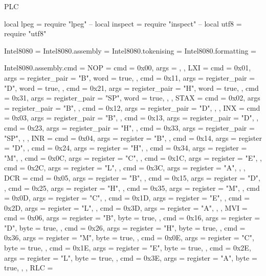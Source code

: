 \startenvironment PLC

\startluacode

local lpeg = require "lpeg"
-- local inspect = require "inspect"
-- local utf8 = require "utf8"

Intel8080 = {}
Intel8080.assembly = {}
Intel8080.tokenising = {}
Intel8080.formatting = {}

Intel8080.assembly.cmd = {
    NOP  = {
        {cmd = 0x00, args = {}},
    },
    LXI  = {
        { cmd = 0x01, args = {{register_pair = "B"},  {word = true}}, },
        { cmd = 0x11, args = {{register_pair = "D"},  {word = true}}, },
        { cmd = 0x21, args = {{register_pair = "H"},  {word = true}}, },
        { cmd = 0x31, args = {{register_pair = "SP"}, {word = true}}, },
    },
    STAX = {
        { cmd = 0x02, args = {{register_pair = "B"}}, },
        { cmd = 0x12, args = {{register_pair = "D"}}, },
    },
    INX  = {
        { cmd = 0x03, args = {{register_pair = "B"}}, },
        { cmd = 0x13, args = {{register_pair = "D"}}, },
        { cmd = 0x23, args = {{register_pair = "H"}}, },
        { cmd = 0x33, args = {{register_pair = "SP"}}, },
    },
    INR  = {
        { cmd = 0x04, args = {{register = "B"}}, },
        { cmd = 0x14, args = {{register = "D"}}, },
        { cmd = 0x24, args = {{register = "H"}}, },
        { cmd = 0x34, args = {{register = "M"}}, },
        { cmd = 0x0C, args = {{register = "C"}}, },
        { cmd = 0x1C, args = {{register = "E"}}, },
        { cmd = 0x2C, args = {{register = "L"}}, },
        { cmd = 0x3C, args = {{register = "A"}}, },
    },
    DCR  = {
        { cmd = 0x05, args = {{register = "B"}}, },
        { cmd = 0x15, args = {{register = "D"}}, },
        { cmd = 0x25, args = {{register = "H"}}, },
        { cmd = 0x35, args = {{register = "M"}}, },
        { cmd = 0x0D, args = {{register = "C"}}, },
        { cmd = 0x1D, args = {{register = "E"}}, },
        { cmd = 0x2D, args = {{register = "L"}}, },
        { cmd = 0x3D, args = {{register = "A"}}, },
    },
    MVI  = {
        { cmd = 0x06, args = {{register = "B"}, {byte = true}}, },
        { cmd = 0x16, args = {{register = "D"}, {byte = true}}, },
        { cmd = 0x26, args = {{register = "H"}, {byte = true}}, },
        { cmd = 0x36, args = {{register = "M"}, {byte = true}}, },
        { cmd = 0x0E, args = {{register = "C"}, {byte = true}}, },
        { cmd = 0x1E, args = {{register = "E"}, {byte = true}}, },
        { cmd = 0x2E, args = {{register = "L"}, {byte = true}}, },
        { cmd = 0x3E, args = {{register = "A"}, {byte = true}}, },
    },
    RLC  = {
}}
